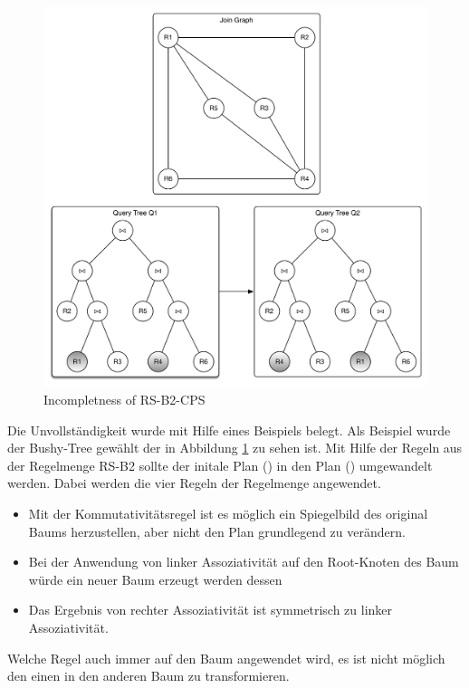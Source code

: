 \begin{figure}[ht]
  \centering
  \includegraphics[width=\textwidth]{02_Related_Work/Graphs.pdf}
  \caption{Incompletness of RS-B2-CPS}
  \label{Incompleteness_RS-B2-CPS}
\end{figure}


Die Unvollständigkeit wurde mit Hilfe eines Beispiels belegt. Als Beispiel wurde der Bushy-Tree gewählt der in Abbildung \ref{Incompleteness_RS-B2-CPS} zu sehen ist. Mit Hilfe der Regeln aus der Regelmenge RS-B2 sollte der initale Plan () in den Plan () umgewandelt werden. Dabei werden die vier Regeln der Regelmenge angewendet.

\begin{itemize}
\item Mit der Kommutativitätsregel ist es möglich ein Spiegelbild des original Baums herzustellen, aber nicht den Plan grundlegend zu verändern.
\item Bei der Anwendung von linker Assoziativität auf den Root-Knoten des Baum würde ein neuer Baum erzeugt werden dessen
\item Das Ergebnis von rechter Assoziativität ist symmetrisch zu linker Assoziativität.
\end{itemize}


Welche Regel auch immer auf den Baum angewendet wird, es ist nicht möglich den einen in den anderen Baum zu transformieren.

